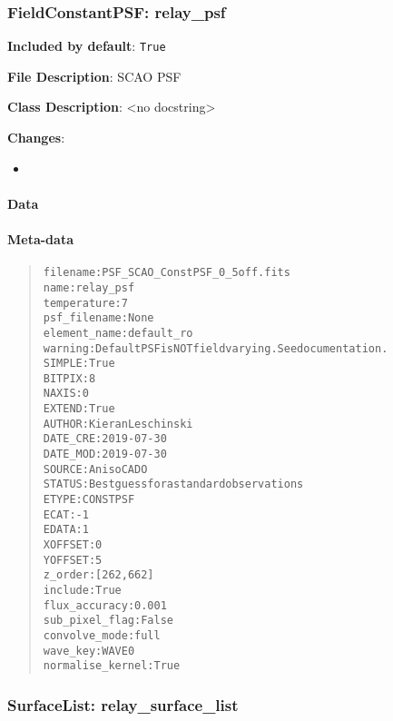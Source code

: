 \subsubsection{FieldConstantPSF: \textquotedbl{}relay\_psf\textquotedbl{}%
  \label{fieldconstantpsf-relay-psf}%
}

\textbf{Included by default}: \texttt{True}

\textbf{File Description}: SCAO PSF

\textbf{Class Description}: <no docstring>

\textbf{Changes}:

\begin{itemize}
\item \end{itemize}


\paragraph{Data%
  \label{data}%
}


\paragraph{Meta-data%
  \label{meta-data}%
}

\begin{quote}
\begin{alltt}
        filename : PSF_SCAO_ConstPSF_0_5off.fits
            name : relay_psf
     temperature : 7
    psf_filename : None
    element_name : default_ro
         warning : Default PSF is NOT field varying. See documentation.
          SIMPLE : True
          BITPIX : 8
           NAXIS : 0
          EXTEND : True
          AUTHOR : Kieran Leschinski
        DATE_CRE : 2019-07-30
        DATE_MOD : 2019-07-30
          SOURCE : AnisoCADO
          STATUS : Best guess for a standard observations
           ETYPE : CONSTPSF
            ECAT : -1
           EDATA : 1
         XOFFSET : 0
         YOFFSET : 5
         z_order : [262, 662]
         include : True
   flux_accuracy : 0.001
  sub_pixel_flag : False
   convolve_mode : full
        wave_key : WAVE0
normalise_kernel : True
\end{alltt}
\end{quote}


\subsubsection{SurfaceList: \textquotedbl{}relay\_surface\_list\textquotedbl{}%
  \label{surfacelist-relay-surface-list}%
}

